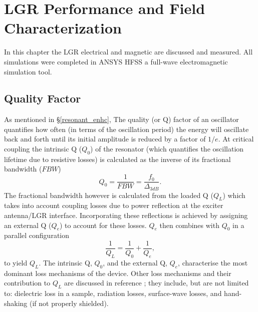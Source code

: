 
\chapter{LGR Performance and Field Characterization} \label{ch3}

In this chapter the LGR electrical and magnetic are discussed and measured. All simulations were completed in ANSYS HFSS a full-wave electromagnetic simulation tool. 

\section{Quality Factor}\label{quality}

As mentioned in \S \ref{resonant_enhc}, The quality (or Q) factor of an oscillator quantifies how often (in terms of the oscillation period) the energy will oscillate back and forth until its initial amplitude is reduced by a factor of $1/e$. At critical coupling the intrinsic Q ($Q_0$) of the resonator (which quantifies the oscillation lifetime due to resistive losses) is calculated as the inverse of its fractional bandwidth ($FBW$)
\begin{equation}
Q_0 = \frac{1}{FBW} = \frac{f_0}{\Delta_{3dB}}.
\end{equation} 
The fractional bandwidth however is calculated from the loaded Q ($Q_L$) which takes into account coupling losses due to power reflection at the exciter antenna/LGR interface. Incorporating these reflections is achieved by assigning an external Q ($Q_e$) to account for these losses. $Q_e$ then combines with $Q_0$ in a parallel configuration
\begin{equation}
\frac{1}{Q_L} = \frac{1}{Q_0} + \frac{1}{Q_e},
\end{equation} 
to yield $Q_L$. The intrinsic Q, $Q_0$, and the external Q, $Q_e$, characterise the most dominant loss mechanisms of the device. Other loss mechanisms and their contribution to $Q_L$ are discussed in reference \cite{piasecki1993field}; they include, but are not limited to: dielectric loss in a sample, radiation losses, surface-wave losses, and hand-shaking (if not properly shielded).

